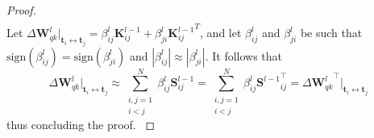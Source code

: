 \begin{proof}
\begin{equation}
\begin{split}
\end{split}
\end{equation}
%
Let $\Delta \bm{W}_{qk}^l\big|_{\bm{t}_i \leftrightarrow \bm{t}_j} = \beta_{ij}^l\bm{K}^{l-1}_{ij} + \beta_{ji}^l{\bm{K}^{l-1}_{ij}}^T$,
and let $\beta^l_{ij}$ and $\beta^l_{ji}$ be such that $\text{sign}(\beta^l_{ij}) = \text{sign}(\beta^l_{ji})$ and $|\beta^l_{ij}| \approx $$|\beta^l_{ji}|$.
%
It follows that
%
\begin{equation}
 \Delta \bm{W}_{qk}^l\big|_{\bm{t}_i \leftrightarrow \bm{t}_j} \approx \sum_{\substack{i,j = 1 \\ i < j}}^N \beta^l_{ij}\bm{S}^{l-1}_{ij} = \sum_{\substack{i,j = 1 \\ i < j}}^N \beta^l_{ij}{\bm{S}^{l-1}}^\top_{ij} = \Delta {\bm{W}_{qk}^l}^\top\big|_{\bm{t}_i \leftrightarrow \bm{t}_j} \,
\end{equation}
%
thus concluding the proof.
%
%
%
%
$$
\end{proof}
